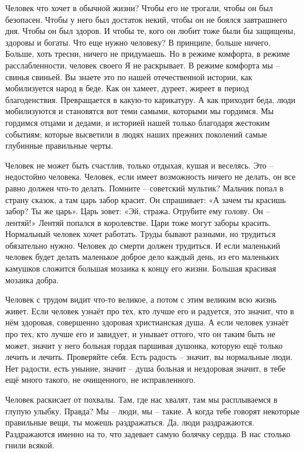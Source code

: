 Человек что хочет в обычной жизни? Чтобы его не трогали, чтобы он был
безопасен. Чтобы у него был достаток некий, чтобы он не боялся завтрашнего дня.
Чтобы он был здоров. И чтобы те, кого он любит тоже были бы защищены, здоровы и
богаты. Что еще нужно человеку? В принципе, больше ничего. Больше, хоть тресни,
ничего не придумаешь. Но в режиме комфорта, в режиме расслабленности, человек
своего Я не раскрывает. В режиме комфорта мы – свинья свиньей. Вы знаете это по
нашей отечественной истории, как мобилизуется народ в беде. Как он хамеет,
дуреет, жиреет в период благоденствия. Превращается в какую-то карикатуру. А
как приходит беда, люди мобилизуются и становятся вот теми самыми, которыми мы
гордимся. Мы гордимся отцами и дедами, и историей нашей только благодаря
жестоким событиям; которые высветили в людях наших прежних поколений самые
глубинные правильные черты.

Человек не может быть счастлив, только отдыхая, кушая и веселясь. Это –
недостойно человека. Человек, если имеет возможность ничего не делать, он все
равно должен что-то делать. Помните – советский мультик? Мальчик попал в страну
сказок, а там царь забор красит. Он спрашивает: «А зачем ты красишь забор? Ты
же царь». Царь зовет: «Эй, стража. Отрубите ему голову. Он – лентяй!» Лентяй
попался в королевстве. Цари тоже могут заборы красить. Нормальный человек хочет
работать. Труды бывают разными, но трудиться обязательно нужно. Человек до
смерти должен трудиться. И если маленький человек будет делать маленькое доброе
дело каждый день, из его маленьких камушков сложится большая мозаика к концу
его жизни. Большая красивая мозаика добра.

Человек с трудом видит что-то великое, а потом с этим великим всю жизнь живет.
Если человек узнаёт про тех, кто лучше его и радуется, это значит, что в нём
здоровая, совершенно здоровая христианская душа. А если человек узнаёт про тех,
кто лучше его и завидует, и унывает оттого, что он таким быть не может, значит
у него больная гордая паршивая душонка, которую ещё только лечить и лечить.
Проверяйте себя. Есть радость – значит, вы нормальные люди. Нет радости, есть
уныние, значит – душа больная и нездоровая значит, в тебе ещё много такого, не
очищенного, не исправленного.

Человек раскисает от похвалы. Там, где нас хвалят, там мы расплываемся в глупую
улыбку. Правда? Мы – люди, мы – такие. А когда тебе говорят некоторые
правильные вещи, ты можешь раздражаться. Да, люди раздражаются. Раздражаются
именно на то, что задевает самую болячку сердца. В нас столько гнили всякой.

